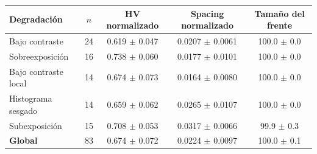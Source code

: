 \begin{tabular}{lcccc}
\hline
\textbf{Degradación} & \textbf{$n$} & \textbf{HV normalizado} & \textbf{Spacing normalizado} & \textbf{Tamaño del frente} \\
\hline
Bajo contraste & 24 & 0.619 $\pm$ 0.047 & 0.0207 $\pm$ 0.0061 & 100.0 $\pm$ 0.0 \\
Sobreexposición & 16 & 0.738 $\pm$ 0.060 & 0.0177 $\pm$ 0.0101 & 100.0 $\pm$ 0.0 \\
Bajo contraste local & 14 & 0.674 $\pm$ 0.073 & 0.0164 $\pm$ 0.0080 & 100.0 $\pm$ 0.0 \\
Histograma sesgado & 14 & 0.659 $\pm$ 0.062 & 0.0265 $\pm$ 0.0107 & 100.0 $\pm$ 0.0 \\
Subexposición & 15 & 0.708 $\pm$ 0.053 & 0.0317 $\pm$ 0.0066 & 99.9 $\pm$ 0.3 \\
\hline
\textbf{Global} & 83 & 0.674 $\pm$ 0.072 & 0.0224 $\pm$ 0.0097 & 100.0 $\pm$ 0.1 \\
\hline
\end{tabular}